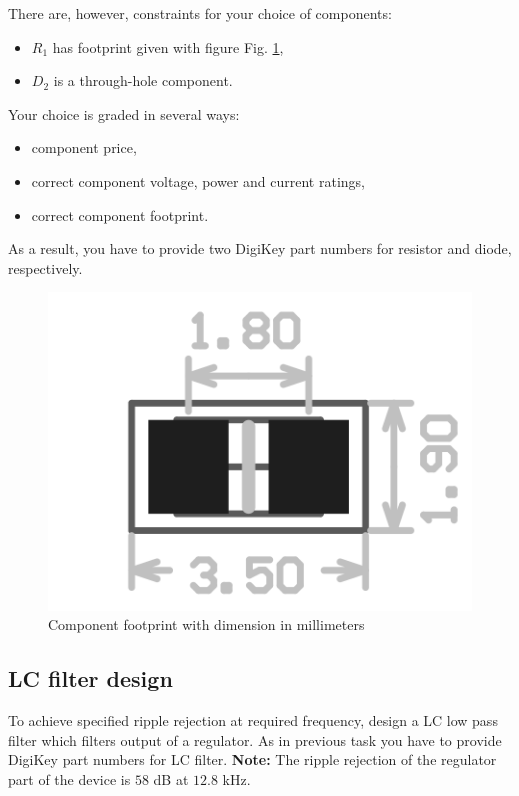 \documentclass{article}
\begin{document}
There are, however, constraints for your choice of components:
\begin{itemize}
	\item $R_1$ has footprint given with figure Fig. \ref{fig:footprint},
	\item $D_2$ is a through-hole component.
\end{itemize} 

Your choice is graded in several ways:
\begin{itemize}
	\item component price,
	\item correct component voltage, power and current ratings,
	\item correct component footprint.
\end{itemize}
As a result, you have to provide two DigiKey part numbers for resistor and 
diode, respectively.

\begin{figure}[h!]
	\centering
	\includegraphics[width=\linewidth]{footprint.png}
	\caption{Component footprint with dimension in millimeters}
	\label{fig:footprint}
\end{figure}

\newpage

\subsection{LC filter design}
\label{ele:task:2}
To achieve specified ripple rejection at required frequency, design a LC low 
pass filter which filters output of a regulator. As in previous task you have 
to provide DigiKey part numbers for LC filter. \textbf{Note:} The ripple 
rejection of the regulator part of the device is $58$ dB at $12.8$ kHz.
\end{document}
